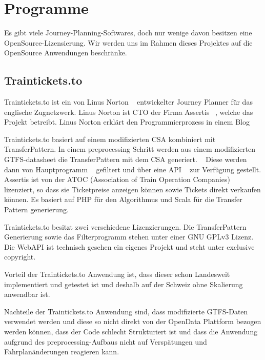 

\section[Programme]{Programme}
\label{sec:programme}

Es gibt viele Journey-Planning-Softwares, doch nur wenige davon besitzen eine OpenSource-Lizensierung. Wir werden uns im Rahmen dieses Projektes auf die OpenSource Anwendungen beschränke.

\subsection{Traintickets.to} 
\label{sec:Traintickets.to}

Traintickets.to ist ein von Linus Norton ~\cite{LinusNorton} entwickelter Journey Planner für das englische Zugnetzwerk. Linus Norton ist CTO der Firma Assertis ~\cite{assertis}, welche das Projekt betreibt. Linus Norton erklärt den Programmierprozess in einem Blog ~\cite{traintickets_blog}


Traintickets.to basiert auf einem modifizierten CSA kombiniert mit TransferPattern. In einem preprocessing Schritt werden aus einem modifizierten GTFS-datasheet die TransferPattern mit dem CSA generiert. ~\cite{git_traintickets_pattern} Diese werden dann von Hauptprogramm ~\cite{git_traintickets_haupt} gefiltert und über eine API ~\cite{git_traintickets_api} zur Verfügung gestellt. Assertis ist von der ATOC (Association of Train Operation Companies) lizenziert, so dass sie Ticketpreise anzeigen können sowie Tickets direkt verkaufen können. Es basiert auf PHP für den Algorithmus und Scala für die Transfer Pattern generierung.

Traintickets.to besitzt zwei verschiedene Lizenzierungen. Die TransferPattern Generierung sowie das Filterprogramm stehen unter einer GNU GPLv3 Lizenz. Die WebAPI ist technisch gesehen ein eigenes Projekt und steht unter exclusive copyright.

Vorteil der Traintickets.to Anwendung ist, dass dieser schon Landesweit implementiert und getestet ist und deshalb auf der Schweiz ohne Skalierung anwendbar ist. ~\cite{traintickets_site}

Nachteile der Traintickets.to Anwendung sind, dass modifizierte GTFS-Daten verwendet werden und diese so nicht direkt von der OpenData Plattform bezogen werden können, dass der Code schlecht Strukturiert ist und dass die Anwendung aufgrund des preprocessing-Aufbaus nicht auf Verspätungen und Fahrplanänderungen reagieren kann.

